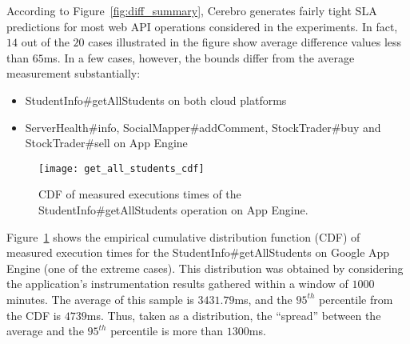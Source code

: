 According to Figure~\ref{fig:diff_summary}, Cerebro generates fairly tight 
SLA predictions for most web API operations considered in the experiments. In fact,
$14$ out of the $20$ cases illustrated in the figure show average difference
values less than $65$ms. In a few cases, however, the bounds differ from the
average measurement substantially:
\begin{itemize}
\item StudentInfo\#getAllStudents on both cloud platforms
\item ServerHealth\#info, SocialMapper\#addComment, StockTrader\#buy and StockTrader\#sell on App Engine
\end{itemize}


\begin{figure}
\centering
\texttt{[image: get\_all\_students\_cdf]}
\caption{CDF of measured executions times of the StudentInfo\#getAllStudents operation on App Engine.}
\label{fig:get_all_students_cdf}
\end{figure}

Figure~\ref{fig:get_all_students_cdf} shows the empirical cumulative
distribution function (CDF) of measured execution times for the 
StudentInfo\#getAllStudents on
Google App Engine (one of the extreme cases). 
This distribution was obtained by considering the application's instrumentation 
results gathered within a window of $1000$ minutes. 
The average of this sample is $3431.79$ms, and the $95^{th}$ percentile
from the CDF is $4739$ms.  Thus, taken as a distribution, the ``spread''
between the average and the $95^{th}$ percentile is more
than $1300$ms.  




